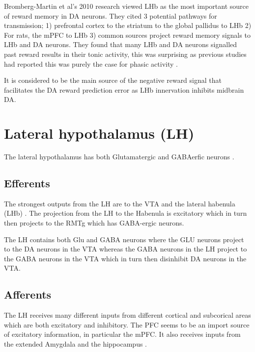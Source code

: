 \documentclass[12pt,a4paper]{article}
\let\oldsection\section
\renewcommand\section{\clearpage\oldsection}
\begin{document}
Bromberg-Martin et al’s 2010 research viewed LHb as the most important source of reward memory in DA neurons. They cited 3 potential pathways for transmission; 1) prefrontal cortex to the striatum to the global pallidus to LHb 2) For rats, the mPFC to LHb 3) common sources project reward memory signals to LHb and DA neurons. They found that many LHb and DA neurons signalled past reward results in their tonic activity, this was surprising as previous studies had reported this was purely the case for phasic activity \citep{Bromberg-Martin2010}.

It is considered to be the main source of the negative reward signal that facilitates the DA reward prediction error as LHb innervation inhibits midbrain DA.\citep{Shen2012}\citep{Shabel2012}\citep{Matsumoto2007}\citep{Barrot2012} 





\section{Lateral hypothalamus (LH)}

The lateral hypothalamus has both Glutamatergic and GABAerfic neurons \citep{Stanley2011}.

\subsection{Efferents}

The strongest outputs from the LH are to the VTA and the lateral habenula (LHb) \citep{Stuber2016}. 
The projection from the LH to the Habenula is excitatory \citep{Poller2013} which in turn then projects to the RMTg which has GABA-ergic neurons.

The LH contains both Glu and GABA neurons where the GLU neurons project to the DA neurons in the VTA whereas the GABA neurons in the LH project to the GABA neurons in the VTA which in turn then disinhibit DA neurons in the VTA. 


\subsection{Afferents}

The LH receives many different inputs from different cortical and subcorical areas which are both excitatory and inhibitory. The PFC seems to be an import source of excitatory information, in particular the mPFC. It also receives inputs from the extended Amygdala and the hippocampus \citep{Stuber2016}.
\end{document}
